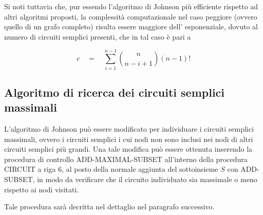 Si noti tuttavia che, pur essendo l'algoritmo di Johnson pi\`u efficiente rispetto ad altri algoritmi proposti, la
complessit\`a computazionale nel caso peggiore (ovvero quello di un grafo completo) risulta essere maggiore dell'
esponenziale, dovuto al numero di circuiti semplici presenti, che in tal caso \`e pari a

\begin{equation*}
    c \quad = \quad \sum_{i = 1}^{n-1} \binom{n}{n-i+1} (n-1)!
\end{equation*}

\subsection{Algoritmo di ricerca dei circuiti semplici massimali} \label{sec:maximal-circuits}
L'algoritmo di Johnson pu\`o essere modificato per individuare i circuiti semplici massimali, ovvero i circuiti
semplici i cui nodi non sono inclusi nei nodi di altri circuiti semplici pi\`u grandi.\newline
Una tale modifica pu\`o essere ottenuta inserendo la procedura di controllo ADD-MAXIMAL-SUBSET all'interno della
procedura CIRCUIT a riga 6, al posto della normale aggiunta del sottoinsieme $S$ con ADD-SUBSET, in modo da verificare
che il circuito individuato sia massimale o meno rispetto ai nodi visitati.

Tale procedura sar\`a decritta nel dettaglio nel paragrafo successivo.


